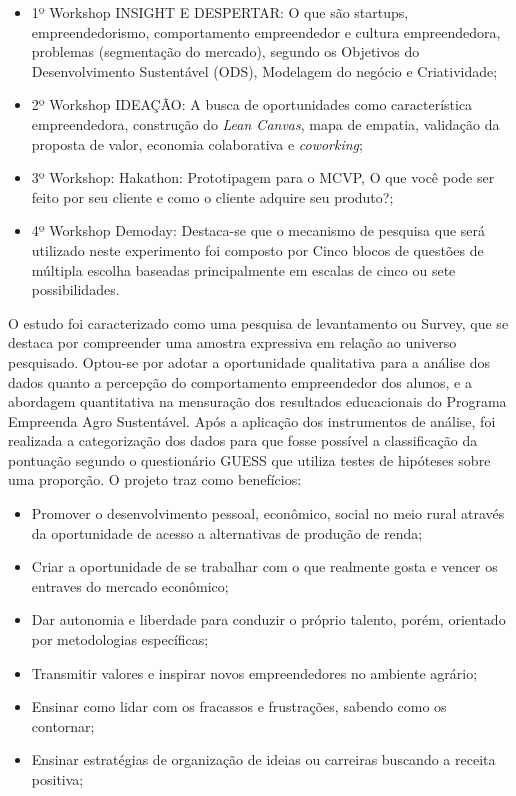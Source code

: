 \begin{itemize}

\item {1º Workshop INSIGHT E DESPERTAR: O que são startups, empreendedorismo, comportamento empreendedor e cultura empreendedora, problemas (segmentação do mercado), segundo os Objetivos do Desenvolvimento Sustentável (ODS), Modelagem do negócio e Criatividade;}
\item {2º Workshop IDEAÇÃO: A busca de oportunidades como característica empreendedora, construção do \textit{Lean Canvas}, mapa de empatia, validação da proposta de valor, economia colaborativa e \textit{coworking};}

\item {3º Workshop: Hakathon: Prototipagem para o MCVP, O que você pode ser feito por seu cliente e como o cliente adquire seu produto?;}
\item {4º Workshop Demoday: Destaca-se que o mecanismo de pesquisa que será utilizado neste experimento foi composto por Cinco blocos de questões de múltipla escolha baseadas principalmente em escalas de cinco ou sete possibilidades.}
\end{itemize}

O estudo foi caracterizado como uma pesquisa de levantamento ou Survey, que se destaca por compreender uma amostra expressiva em relação ao universo pesquisado. Optou-se por adotar a oportunidade qualitativa para a análise dos dados quanto a percepção do comportamento empreendedor dos alunos, e a abordagem quantitativa na mensuração dos resultados educacionais do Programa Empreenda Agro Sustentável. Após a aplicação dos instrumentos de análise, foi realizada a categorização dos dados para que fosse possível a classificação da pontuação segundo o questionário GUESS que utiliza testes de hipóteses sobre uma proporção. O projeto traz como benefícios: 

\begin{itemize}
\item{Promover o desenvolvimento pessoal, econômico, social no meio rural através da oportunidade de acesso a alternativas de produção de renda;}
\item{Criar a oportunidade de se trabalhar com o que realmente gosta e vencer os entraves do mercado econômico;}
\item{Dar autonomia e liberdade para conduzir o próprio talento, porém, orientado por metodologias específicas;}
\item{Transmitir valores e inspirar novos empreendedores no ambiente agrário;}
\item{Ensinar como lidar com os fracassos e frustrações, sabendo como os contornar;}
\item{Ensinar estratégias de organização de ideias ou carreiras buscando a receita positiva;}
\end{itemize}




